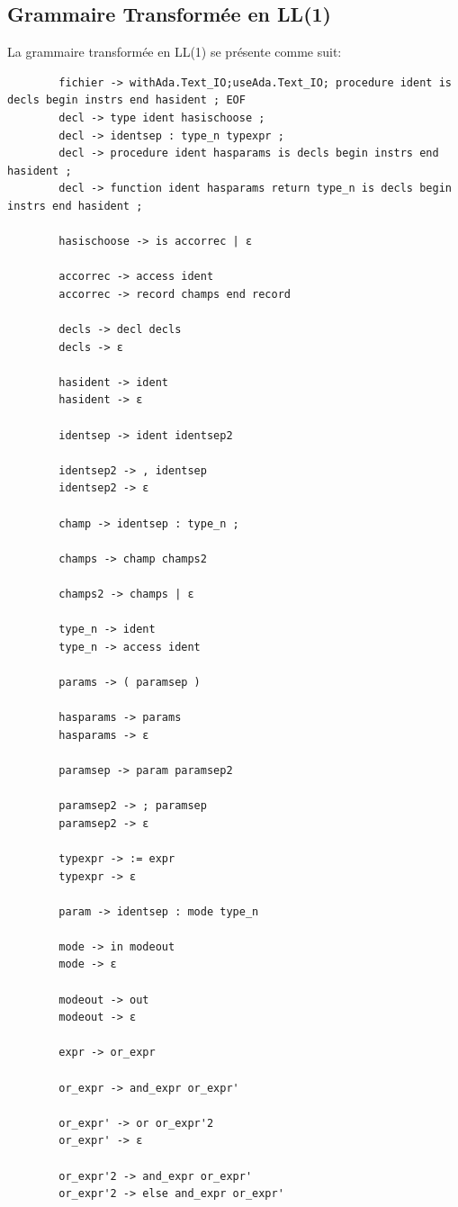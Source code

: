 \documentclass[french,a4paper]{article}
\begin{document}
    \subsection{Grammaire Transformée en LL(1)}
    La grammaire transformée en LL(1) se présente comme suit:
    \begin{verbatim}
        fichier -> withAda.Text_IO;useAda.Text_IO; procedure ident is decls begin instrs end hasident ; EOF
        decl -> type ident hasischoose ;
        decl -> identsep : type_n typexpr ;
        decl -> procedure ident hasparams is decls begin instrs end hasident ;
        decl -> function ident hasparams return type_n is decls begin instrs end hasident ;

        hasischoose -> is accorrec | ε

        accorrec -> access ident
        accorrec -> record champs end record

        decls -> decl decls
        decls -> ε

        hasident -> ident
        hasident -> ε

        identsep -> ident identsep2

        identsep2 -> , identsep
        identsep2 -> ε

        champ -> identsep : type_n ;

        champs -> champ champs2

        champs2 -> champs | ε

        type_n -> ident
        type_n -> access ident

        params -> ( paramsep )

        hasparams -> params
        hasparams -> ε

        paramsep -> param paramsep2

        paramsep2 -> ; paramsep
        paramsep2 -> ε

        typexpr -> := expr
        typexpr -> ε

        param -> identsep : mode type_n

        mode -> in modeout
        mode -> ε

        modeout -> out
        modeout -> ε

        expr -> or_expr

        or_expr -> and_expr or_expr'

        or_expr' -> or or_expr'2
        or_expr' -> ε

        or_expr'2 -> and_expr or_expr'
        or_expr'2 -> else and_expr or_expr'


\end{verbatim}
\end{document}
